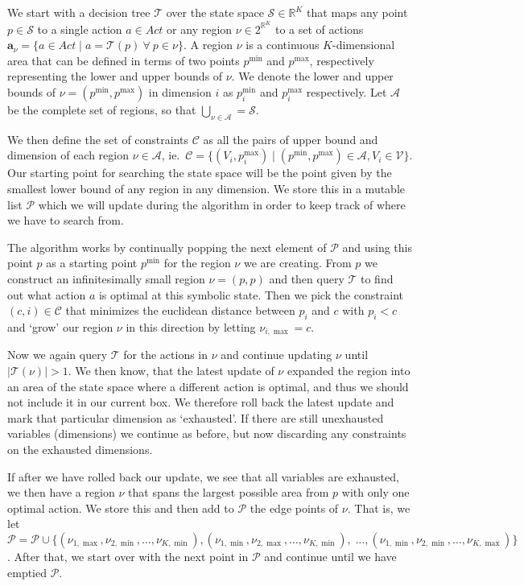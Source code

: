 We start with a decision tree $\mathcal{T}$ over the state space $\mathcal{S}
\in \mathbb{R}^K$ that maps any point $p \in \mathcal{S}$ to a single action $a
\in Act$ or any region $\nu \in 2^{\mathbb{R}^K}$ to a set of actions
$\mathbf{a}_{\nu} = \{ a \in Act \mid a = \mathcal{T}(p) \ \forall \ p \in \nu
\}$. A region $\nu$ is a continuous $K$-dimensional area that can be defined in
terms of two points $p^{\min}$ and $p^{\max}$, respectively representing the
lower and upper bounds of $\nu$. We denote the lower and upper bounds of $\nu =
(p^{\min},p^{\max})$ in dimension $i$ as $p^{\min}_i$ and $p^{\max}_i$
respectively. Let $\mathcal{A}$ be the complete set of regions, so that
$\bigcup_{\nu \in \mathcal{A}} = \mathcal{S}$.

We then define the set of constraints $\mathcal{C}$ as all the pairs of upper
bound and dimension of each region $\nu \in \mathcal{A}$, ie.\ $\mathcal{C} = \{
(V_i, p^{\max}_i) \mid (p^{\min},p^{\max}) \in \mathcal{A}, V_i \in \mathcal{V}
\}$. Our starting point for searching the state space will be the point given by
the smallest lower bound of any region in any dimension. We store this in a
mutable list $\mathcal{P}$ which we will update during the algorithm in order to
keep track of where we have to search from.

The algorithm works by continually popping the next element of $\mathcal{P}$ and
using this point $p$ as a starting point $p^{\min}$ for the region $\nu$ we are
creating. From $p$ we construct an
infinitesimally small region $\nu = (p,p)$ and then query $\mathcal{T}$ to find
out what action $a$ is optimal at this symbolic state. Then we pick the
constraint $(c,i) \in \mathcal{C}$ that minimizes the euclidean distance between
$p_i$ and $c$ with $p_i < c$ and `grow' our region $\nu$ in this direction by
letting $\nu_{i,\max} = c$.

Now we again query $\mathcal{T}$ for the actions in $\nu$ and continue updating
$\nu$ until $|\mathcal{T}(\nu)| > 1$. We then know, that the latest
update of $\nu$ expanded the region into an area of the state space where a different
action is optimal, and thus we should not include it in our current box. We
therefore roll back the latest update and mark that particular dimension as
`exhausted'. If there are still unexhausted variables (dimensions) we continue
as before, but now discarding any constraints on the exhausted dimensions.

If after we have rolled back our update, we see that all variables are
exhausted, we then have a region $\nu$ that spans the largest possible area from
$p$ with only one optimal action. We store this and then add to $\mathcal{P}$
the edge points of $\nu$.  That is, we let $\mathcal{P} = \mathcal{P} \cup \{
(\nu_{1,\max}, \nu_{2,\min}, \ldots, \nu_{K,\min} ), (\nu_{1,\min},
\nu_{2,\max}, \ldots, \nu_{K,\min}), \;\ldots,\allowbreak (\nu_{1,\min},
\nu_{2,\min}, \ldots, \nu_{K,\max}) \}$.  After that, we start over with the
next point in $\mathcal{P}$ and continue until we have emptied $\mathcal{P}$.


